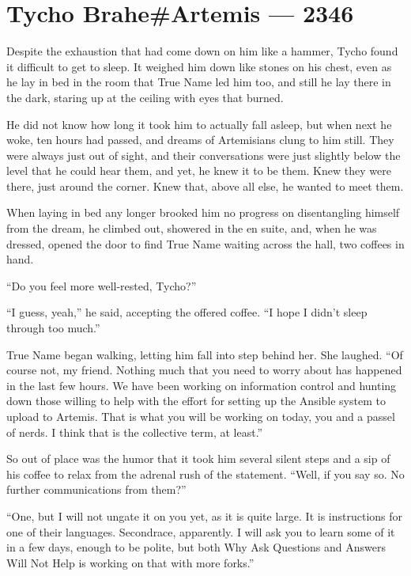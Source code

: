 \hypertarget{tycho-braheartemis-2346}{%
\chapter{Tycho Brahe\#Artemis — 2346}\label{tycho-braheartemis-2346}}

Despite the exhaustion that had come down on him like a hammer, Tycho found it difficult to get to sleep. It weighed him down like stones on his chest, even as he lay in bed in the room that True Name led him too, and still he lay there in the dark, staring up at the ceiling with eyes that burned.

He did not know how long it took him to actually fall asleep, but when next he woke, ten hours had passed, and dreams of Artemisians clung to him still. They were always just out of sight, and their conversations were just slightly below the level that he could hear them, and yet, he knew it to be them. Knew they were there, just around the corner. Knew that, above all else, he wanted to meet them.

When laying in bed any longer brooked him no progress on disentangling himself from the dream, he climbed out, showered in the en suite, and, when he was dressed, opened the door to find True Name waiting across the hall, two coffees in hand.

``Do you feel more well-rested, Tycho?''

``I guess, yeah,'' he said, accepting the offered coffee. ``I hope I didn't sleep through too much.''

True Name began walking, letting him fall into step behind her. She laughed. ``Of course not, my friend. Nothing much that you need to worry about has happened in the last few hours. We have been working on information control and hunting down those willing to help with the effort for setting up the Ansible system to upload to Artemis. That is what you will be working on today, you and a passel of nerds. I think that is the collective term, at least.''

So out of place was the humor that it took him several silent steps and a sip of his coffee to relax from the adrenal rush of the statement. ``Well, if you say so. No further communications from them?''

``One, but I will not ungate it on you yet, as it is quite large. It is instructions for one of their languages. Secondrace, apparently. I will ask you to learn some of it in a few days, enough to be polite, but both Why Ask Questions and Answers Will Not Help is working on that with more forks.''

